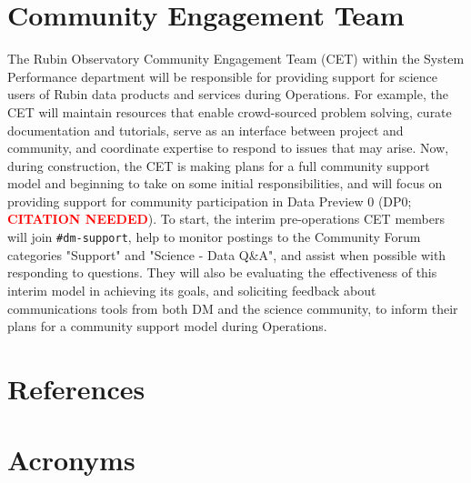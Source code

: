 \documentclass[DM,lsstdraft,authoryear,toc]{lsstdoc}
\begin{document}
\section{Community Engagement Team}\label{sec:cet}

The Rubin Observatory Community Engagement Team (CET) within the System Performance department will be responsible for providing support for science users of Rubin data products and services during Operations.
For example, the CET will maintain resources that enable crowd-sourced problem solving, curate documentation and tutorials, serve as an interface between project and community, and coordinate expertise to respond to issues that may arise.
Now, during construction, the CET is making plans for a full community support model and beginning to take on some initial responsibilities, and will focus on providing support for community participation in Data Preview 0 (DP0; \textcolor{red}{\bf CITATION NEEDED}).
To start, the interim pre-operations CET members will join {\tt \#dm-support}, help to monitor postings to the Community Forum categories "Support" and "Science - Data Q\&A", and assist when possible with responding to questions.
They will also be evaluating the effectiveness of this interim model in achieving its goals, and soliciting feedback about communications tools from both DM and the science community, to inform their plans for a community support model during Operations.

\appendix
\section{References} \label{sec:bib}
\renewcommand{\refname}{} %


\section{Acronyms} \label{sec:acronyms}

\end{document}
